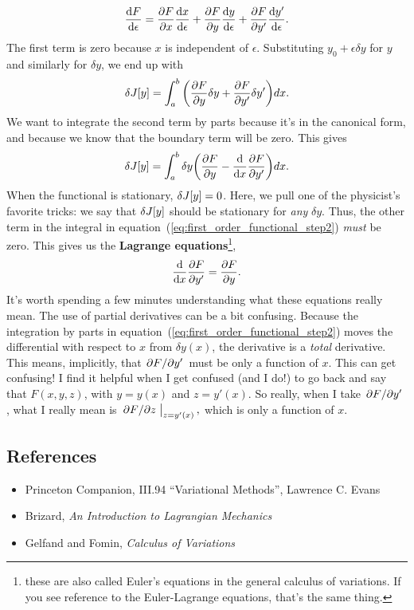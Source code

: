 \begin{equation}
  \label{eq:chain_rule}
  \dv{F}{\epsilon} = \pdv{F}{x} \dv{x}{\epsilon} + \pdv{F}{y} \dv{y}{\epsilon} + \pdv{F}{y'} \dv{y'}{\epsilon}.
\end{equation}
The first term is zero because $x$ is independent of $\epsilon$. Substituting $y_0 + \epsilon \delta y$ for $y$ and similarly for $\delta y$, we end up with
\begin{equation}
  \label{eq:first_order_functional_step2}
    \var{J[y]} = \int_a^b \qty(\pdv{F}{y} \delta y + \pdv{F}{y'} \delta y') dx.
\end{equation}
We want to integrate the second term by parts because it's in the canonical form, and because we know that the boundary term will be zero. This gives 
\begin{equation}
  \label{eq:first_order_functional_step2}
    \var{J[y]} = \int_a^b \delta y \qty(\pdv{F}{y} - \dv{x} \pdv{F}{y'}) dx.
\end{equation}
When the functional is stationary, $\var{J[y]} = 0$. Here, we pull one of the physicist's favorite tricks: we say that $\var{J[y]}$ should be stationary for \emph{any} $\delta y$. Thus, the other term in the integral in equation~(\ref{eq:first_order_functional_step2}) \emph{must} be zero. This gives us the \textbf{Lagrange equations}\footnote{these are also called Euler's equations in the general calculus of variations. If you see reference to the Euler-Lagrange equations, that's the same thing.},
\begin{equation}
  \label{eq:1}
  \dv{x} \pdv{F}{y'} = \pdv{F}{y}.
\end{equation}
It's worth spending a few minutes understanding what these equations really mean. The use of partial derivatives can be a bit confusing. Because the integration by parts in equation~(\ref{eq:first_order_functional_step2}) moves the differential with respect to $x$ from $\delta y(x)$, the derivative is a \emph{total} derivative. This means, implicitly, that $\pdv*{F}{y'}$ must be only a function of $x$. This can get confusing! I find it helpful when I get confused (and I do!) to go back and say that $F(x, y, z)$, with $y = y(x)$ and $z = y'(x)$. So really, when I take $\pdv*{F}{y'}$, what I really mean is $\eval{\pdv*{F}{z}}_{z = y'(x)},$ which is only a function of $x$.

\subsection{References}
\begin{itemize}
\item Princeton Companion, III.94 ``Variational Methods'', Lawrence C. Evans
\item Brizard, \emph{An Introduction to Lagrangian Mechanics}
\item Gelfand and Fomin, \emph{Calculus of Variations}
\end{itemize}

